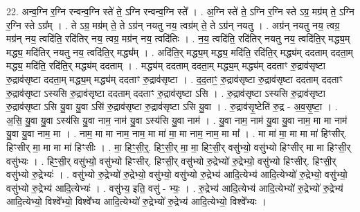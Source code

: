 \documentclass[17pt]{extarticle}
\begin{document}
22. अन्व॒ग्नि र॒ग्नि रन्वन्व॒ग्नि स्ते॑ ते॒ ऽग्नि रन्वन्व॒ग्नि स्ते᳚ । . अ॒ग्नि स्ते॑ ते॒ ऽग्नि र॒ग्नि स्ते ऽग्र॒ मग्र॑म् ते॒ ऽग्नि र॒ग्नि स्ते ऽग्र᳚म् । . ते ऽग्र॒ मग्र॑म् ते॒ ते ऽग्र॑न् नयतु नय॒ त्वग्र॑म् ते॒ ते ऽग्र॑न् नयतु । . अग्र॑न् नयतु नय॒ त्वग्र॒ मग्र॑न् नय॒ त्वदि॑ति॒ रदि॑तिर् नय॒ त्वग्र॒ मग्र॑न् नय॒ त्वदि॑तिः । . न॒य॒ त्वदि॑ति॒ रदि॑तिर् नयतु नय॒ त्वदि॑ति॒र् मद्ध्य॒म् मद्ध्य॒ मदि॑तिर् नयतु नय॒ त्वदि॑ति॒र् मद्ध्य᳚म् । . अदि॑ति॒र् मद्ध्य॒म् मद्ध्य॒ मदि॑ति॒ रदि॑ति॒र् मद्ध्य॑म् ददताम् ददता॒म् मद्ध्य॒ मदि॑ति॒ रदि॑ति॒र् मद्ध्य॑म् ददताम् । . मद्ध्य॑म् ददताम् ददता॒म् मद्ध्य॒म् मद्ध्य॑म् ददताꣳ रु॒द्राव॑सृष्टा रु॒द्राव॑सृष्टा ददता॒म् मद्ध्य॒म् मद्ध्य॑म् ददताꣳ रु॒द्राव॑सृष्टा । . द॒द॒ताꣳ॒॒ रु॒द्राव॑सृष्टा रु॒द्राव॑सृष्टा ददताम् ददताꣳ रु॒द्राव॑सृष्टा ऽस्यसि रु॒द्राव॑सृष्टा ददताम् ददताꣳ रु॒द्राव॑सृष्टा ऽसि । . रु॒द्राव॑सृष्टा ऽस्यसि रु॒द्राव॑सृष्टा रु॒द्राव॑सृष्टा ऽसि यु॒वा यु॒वा ऽसि॑ रु॒द्राव॑सृष्टा रु॒द्राव॑सृष्टा ऽसि यु॒वा । . रु॒द्राव॑सृ॒ष्टेति॑ रु॒द्र - अ॒व॒सृ॒ष्टा॒ । . अ॒सि॒ यु॒वा यु॒वा ऽस्य॑सि यु॒वा नाम॒ नाम॑ यु॒वा ऽस्य॑सि यु॒वा नाम॑ । . यु॒वा नाम॒ नाम॑ यु॒वा यु॒वा नाम॒ मा मा नाम॑ यु॒वा यु॒वा नाम॒ मा । . नाम॒ मा मा नाम॒ नाम॒ मा मा॑ मा॒ मा नाम॒ नाम॒ मा मा᳚ । . मा मा॑ मा॒ मा मा मा॑ हिꣳसीर्. हिꣳसीर् मा॒ मा मा मा॑ हिꣳसीः । . मा॒ हिꣳ॒॒सी॒र्॒. हिꣳ॒॒सी॒र् मा॒ मा॒ हिꣳ॒॒सी॒र् वसु॑भ्यो॒ वसु॑भ्यो हिꣳसीर् मा मा हिꣳसी॒र् वसु॑भ्यः । . हिꣳ॒॒सी॒र् वसु॑भ्यो॒ वसु॑भ्यो हिꣳसीर्. हिꣳसी॒र् वसु॑भ्यो रु॒द्रेभ्यो॑ रु॒द्रेभ्यो॒ वसु॑भ्यो हिꣳसीर्. हिꣳसी॒र् वसु॑भ्यो रु॒द्रेभ्यः॑ । . वसु॑भ्यो रु॒द्रेभ्यो॑ रु॒द्रेभ्यो॒ वसु॑भ्यो॒ वसु॑भ्यो रु॒द्रेभ्य॑ आदि॒त्येभ्य॑ आदि॒त्येभ्यो॑ रु॒द्रेभ्यो॒ वसु॑भ्यो॒ वसु॑भ्यो रु॒द्रेभ्य॑ आदि॒त्येभ्यः॑ । . वसु॑भ्य॒ इति॒ वसु॑ - भ्यः॒ । . रु॒द्रेभ्य॑ आदि॒त्येभ्य॑ आदि॒त्येभ्यो॑ रु॒द्रेभ्यो॑ रु॒द्रेभ्य॑ आदि॒त्येभ्यो॒ विश्वे᳚भ्यो॒ विश्वे᳚भ्य आदि॒त्येभ्यो॑ रु॒द्रेभ्यो॑ रु॒द्रेभ्य॑ आदि॒त्येभ्यो॒ विश्वे᳚भ्यः । \newline
\end{document}
